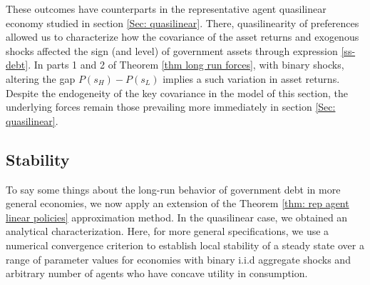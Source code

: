 \documentclass[thmsb,11pt]{article}
\begin{document}
  These outcomes have  counterparts in  the representative agent quasilinear economy studied in section \ref{Sec: quasilinear}.
  There, quasilinearity  of preferences allowed us to characterize how the covariance of the asset returns
  and  exogenous shocks affected the sign (and level) of government assets through expression \eqref{ss-debt}.
  In parts 1 and 2 of Theorem \ref{thm long run forces}, with binary shocks,  altering the gap $P(s_H)-P(s_L)$ implies  a
  such  variation in asset returns. Despite the endogeneity of the key covariance in the model of this section,
  the  underlying forces remain those prevailing more immediately in section \ref{Sec: quasilinear}.



\subsection{Stability}\label{sec:stability}
To say some things about the long-run behavior of government debt   in more general  economies, we now apply an extension of  the Theorem \ref{thm: rep agent linear policies}  approximation method.
  In the quasilinear case, we  obtained an analytical characterization.  Here,
for more general specifications, we use a numerical  convergence criterion to  establish local stability of a steady state over a range of parameter values for economies with binary i.i.d aggregate shocks and arbitrary number of agents who have concave utility in consumption. 
\end{document}
